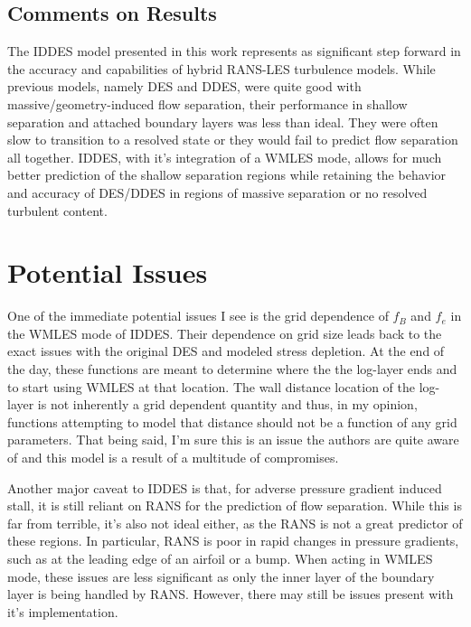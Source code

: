 \documentclass{ucb}
\begin{document}
\subsection{Comments on Results}
The IDDES model presented in this work represents as significant step forward in the accuracy and capabilities of hybrid RANS-LES turbulence models. While previous models, namely DES and DDES, were quite good with massive/geometry-induced flow separation, their performance in shallow separation and attached boundary layers was less than ideal. They were often slow to transition to a resolved state or they would fail to predict flow separation all together. IDDES, with it's integration of a WMLES mode, allows for much better prediction of the shallow separation regions while retaining the behavior and accuracy of DES/DDES in regions of massive separation or no resolved turbulent content.


\section{Potential Issues}
One of the immediate potential issues I see is the grid dependence of \(f_B \) and \(f_e \) in the WMLES mode of IDDES. Their dependence on grid size leads back to the exact issues with the original DES and modeled stress depletion. At the end of the day, these functions are meant to determine where the the log-layer ends and to start using WMLES at that location. The wall distance location of the log-layer is not inherently a grid dependent quantity and thus, in my opinion, functions attempting to model that distance should not be a function of any grid parameters. That being said, I'm sure this is an issue the authors are quite aware of and this model is a result of a multitude of compromises.

Another major caveat to IDDES is that, for adverse pressure gradient induced stall, it is still reliant on RANS for the prediction of flow separation. While this is far from terrible, it's also not ideal either, as the RANS is not a great predictor of these regions. 
In particular, RANS is poor in rapid changes in pressure gradients, such as at the leading edge of an airfoil or a bump. 
When acting in WMLES mode, these issues are less significant as only the inner layer of the boundary layer is being handled by RANS. However, there may still be issues present with it's implementation. 

\end{document}
